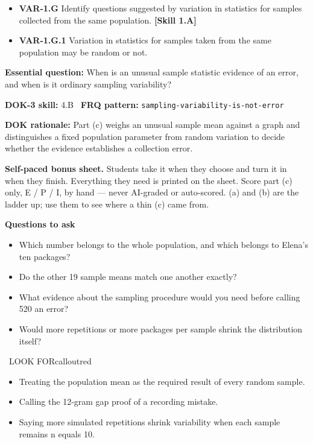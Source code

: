 \documentclass[11pt]{article}
\begin{document}


{\small
\begin{itemize}[leftmargin=1.5em,itemsep=2pt,topsep=2pt]
  \item \textbf{VAR-1.G} Identify questions suggested by variation in statistics for samples collected from the same population. \textbf{[Skill 1.A]}
  \item \textbf{VAR-1.G.1} Variation in statistics for samples taken from the same population may be random or not.
\end{itemize}
}
\textbf{Essential question:} When is an unusual sample statistic evidence of an error, and when is it ordinary sampling variability?\par
\textbf{DOK-3 skill:} 4.B \textperiodcentered\ \textbf{FRQ pattern:} {\small\texttt{sampling-\allowbreak{}variability-\allowbreak{}is-\allowbreak{}not-\allowbreak{}error}}\par
\textbf{DOK rationale:} Part (c) weighs an unusual sample mean against a graph and distinguishes a fixed population parameter from random variation to decide whether the evidence establishes a collection error.\par

\textbf{Self-paced bonus sheet.} Students take it when they choose and turn it in when they finish. Everything they need is printed on the sheet. Score part (c) only, E / P / I, by hand --- never AI-graded or auto-scored. (a) and (b) are the ladder up; use them to see where a thin (c) came from.\par

\textbf{Questions to ask}
\begin{itemize}[leftmargin=1.5em,itemsep=2pt,topsep=2pt]
  \item Which number belongs to the whole population, and which belongs to Elena's ten packages?
  \item Do the other 19 sample means match one another exactly?
  \item What evidence about the sampling procedure would you need before calling 520 an error?
  \item Would more repetitions or more packages per sample shrink the distribution itself?
\end{itemize}

\begin{callout}{\IconWarn\ LOOK FOR}{calloutred}
\begin{itemize}[leftmargin=1.5em,itemsep=2pt,topsep=2pt]
  \item Treating the population mean as the required result of every random sample.
  \item Calling the 12-gram gap proof of a recording mistake.
  \item Saying more simulated repetitions shrink variability when each sample remains n equals 10.
\end{itemize}
\end{callout}
\end{document}
